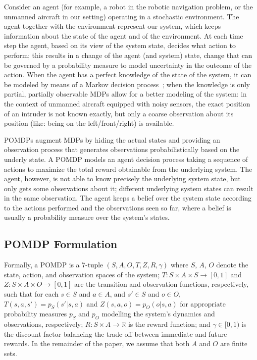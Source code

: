 \documentclass[orivec]{llncs}
\newcommand{\reals}{\mathbb{R}}
\newcommand{\states}{S}
\newcommand{\actions}{A}
\newcommand{\observables}{O}
\newcommand{\trans}{T}
\newcommand{\obs}{Z}
\newcommand{\reward}{R}
\newcommand{\discount}{\gamma}
\begin{document}
Consider an agent (for example, a robot in the robotic navigation problem, or the unmanned aircraft in our setting) operating in a stochastic environment. 
The agent together with the environment represent our system, which keeps information about the state of the agent and of the environment. 
At each time step the agent, based on its view of the system state, decides what action to perform; 
this results in a change of the agent (and system) state, change that can be governed by a probability measure to model uncertainty in the outcome of the action.
When the agent has a perfect knowledge of the state of the system, it can be modeled by means of a Markov decision process~\cite{Puterman05};
when the knowledge is only partial, partially observable MDPs allow for a better modeling of the system:
in the context of unmanned aircraft equipped with noisy sensors, the exact position of an intruder is not known exactly, but only a coarse observation about its position (like: being on the left/front/right) is available.

POMDPs augment MDPs by hiding the actual states and providing an observation process that generates observations probabilistically based on the underly state. 
A POMDP models an agent decision process taking a sequence of actions to maximize the total reward obtainable from the underlying system. 
The agent, however, is not able to know precisely the underlying system state, but only gets some observations about it; 
different underlying system states can result in the same observation.
The agent keeps a belief over the system state according to the actions performed and the observations seen so far, where a belief is usually a probability measure over the system's states.


\subsection{POMDP Formulation}
\label{ssec:POMDPFormulation}

Formally, a POMDP is a 7-tuple $(\states, \actions, \observables, \trans, \obs, \reward, \discount)$ where $\states$, $\actions$, $\observables$ denote the state, action, and observation spaces of the system;
$\trans \colon \states \times \actions \times \states \to [0,1]$ and $\obs \colon \states \times \actions \times \observables \to [0,1]$ are the transition and observation functions, respectively, such that for each $s \in \states$ and $a \in \actions$, and $s' \in \states$ and $o \in \observables$, $\trans(s, a, s') = p_{\states}(s' | s, a)$ and $\obs(s, a, o) = p_{\observables}(o | s, a)$ for appropriate probability measures $p_{\states}$ and $p_{\observables}$ modelling the system's dynamics and observations, respectively; 
$\reward \colon \states \times \actions \to \reals$ is the reward function; 
and $\discount \in [0,1)$ is the discount factor balancing the trade-off between immediate and future rewards.
In the remainder of the paper, we assume that both $\actions$ and $\observables$ are finite sets.
\end{document}
